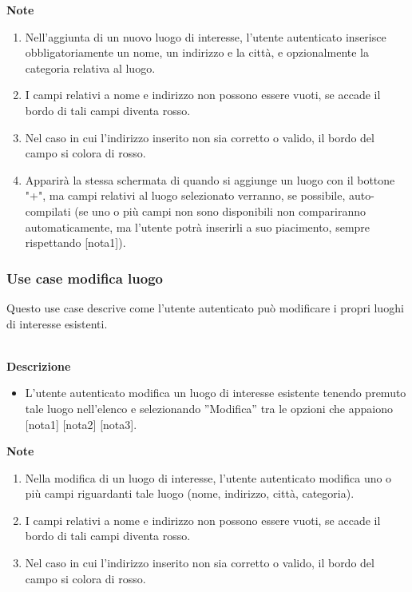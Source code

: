 \documentclass[a4paper,12pt]{article}
\begin{document}
\textbf{Note}
\begin{enumerate} \setlength\itemsep{0.01em}
\item Nell'aggiunta di un nuovo luogo di interesse, l'utente autenticato inserisce obbligatoriamente un nome, un indirizzo e la città, e opzionalmente la categoria relativa al luogo.
\item I campi relativi a nome e indirizzo non possono essere vuoti, se accade il bordo di tali campi diventa rosso.
\item Nel caso in cui l'indirizzo inserito non sia corretto o valido, il bordo del campo si colora di rosso.
\item Apparirà la stessa schermata di quando si aggiunge un luogo con il bottone "+", ma campi relativi al luogo selezionato verranno, se possibile, auto-compilati (se uno o più campi non sono disponibili non compariranno automaticamente, ma l'utente potrà inserirli a suo piacimento, sempre rispettando [nota1]).
\end{enumerate}



\subsubsection*{Use case modifica luogo}

Questo use case descrive come l'utente autenticato può modificare i propri luoghi di interesse esistenti.

\textbf{\\Descrizione}
\begin{itemize} \setlength\itemsep{0.01em}
\item L'utente autenticato modifica un luogo di interesse esistente tenendo premuto tale luogo nell'elenco e selezionando ''Modifica'' tra le opzioni che appaiono [nota1] [nota2] [nota3].
\end{itemize}

\textbf{Note}
\begin{enumerate} \setlength\itemsep{0.01em}
\item Nella modifica di un luogo di interesse, l'utente autenticato modifica uno o più campi riguardanti tale luogo (nome, indirizzo, città, categoria).
\item I campi relativi a nome e indirizzo non possono essere vuoti, se accade il bordo di tali campi diventa rosso.
\item Nel caso in cui l'indirizzo inserito non sia corretto o valido, il bordo del campo si colora di rosso.
\end{enumerate}
\end{document}
